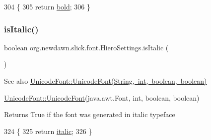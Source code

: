 \begin{DoxyCode}
304                              \{
305         \textcolor{keywordflow}{return} \mbox{\hyperlink{classorg_1_1newdawn_1_1slick_1_1font_1_1_hiero_settings_a836242ef5a8edc24a2b5b8c85f9160eb}{bold}};
306     \}
\end{DoxyCode}
\mbox{\label{classorg_1_1newdawn_1_1slick_1_1font_1_1_hiero_settings_a55e61d2f7afa7d923f297f52e4ee30ec}} 
\subsubsection{\texorpdfstring{is\+Italic()}{isItalic()}}
{\footnotesize\ttfamily boolean org.\+newdawn.\+slick.\+font.\+Hiero\+Settings.\+is\+Italic (\begin{DoxyParamCaption}{ }\end{DoxyParamCaption})\hspace{0.3cm}{\ttfamily [inline]}}

\begin{DoxySeeAlso}{See also}
\mbox{\hyperlink{classorg_1_1newdawn_1_1slick_1_1_unicode_font_a45cb814b2f8c0ec1e8dbc92c4594b33f}{Unicode\+Font\+::\+Unicode\+Font(\+String, int, boolean, boolean)}} 

\mbox{\hyperlink{classorg_1_1newdawn_1_1slick_1_1_unicode_font_acb84ea3da65e6ac55ce2283bc71e41cf}{Unicode\+Font\+::\+Unicode\+Font}}(java.\+awt.\+Font, int, boolean, boolean)
\end{DoxySeeAlso}
\begin{DoxyReturn}{Returns}
True if the font was generated in italic typeface 
\end{DoxyReturn}

\begin{DoxyCode}
324                                \{
325         \textcolor{keywordflow}{return} \mbox{\hyperlink{classorg_1_1newdawn_1_1slick_1_1font_1_1_hiero_settings_a4e55c90c505a6a53fa3684288d379e6a}{italic}};
326     \}
\end{DoxyCode}
\mbox{\label{classorg_1_1newdawn_1_1slick_1_1font_1_1_hiero_settings_a68c3fd89363f3c8f84e9cfb0c4c0ad08}} 
